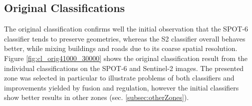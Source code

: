 \documentclass[10pt]{article}
\newcommand{\tile}{41000_30000}
\begin{document}
\subsection{Original Classifications}
The original classification confirms well the initial observation that the SPOT-6 classifier tends to preserve geometries, whereas the S2 classifier overall behaves better, while mixing buildings and roads due to its coarse spatial resolution. Figure \ref{fig:cl_orig\tile} shows the original classification result from the individual classifications on the SPOT-6 and Sentinel-2 images. The presented zone was selected in particular to illustrate problems of both classifiers and improvements yielded by fusion and regulation, however the initial classifiers show better results in other zones (sec. \ref{subsec:otherZones}).
\end{document}
